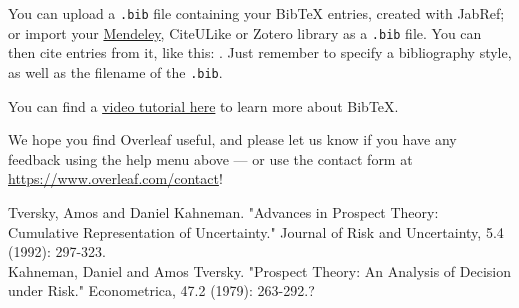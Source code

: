 \documentclass[12pt, letterpaper]{article}
\numberwithin{equation}{section}
\theoremstyle{definition}
\begin{document}
You can upload a \verb|.bib| file containing your BibTeX entries, created with JabRef; or import your \href{https://www.overleaf.com/blog/184}{Mendeley}, CiteULike or Zotero library as a \verb|.bib| file. You can then cite entries from it, like this: \cite{greenwade93}. Just remember to specify a bibliography style, as well as the filename of the \verb|.bib|.

You can find a \href{https://www.overleaf.com/help/97-how-to-include-a-bibliography-using-bibtex}{video tutorial here} to learn more about BibTeX.

We hope you find Overleaf useful, and please let us know if you have any feedback using the help menu above --- or use the contact form at \url{https://www.overleaf.com/contact}!




\noindent
\hangindent=0.7cm
Tversky, Amos and Daniel Kahneman. "Advances in Prospect Theory: Cumulative Representation of Uncertainty." Journal of Risk and Uncertainty, 5.4 (1992): 297-323.\\

\noindent
\hangindent=0.7cm
Kahneman, Daniel and Amos Tversky. "Prospect Theory: An Analysis of Decision under Risk." Econometrica, 47.2 (1979): 263-292.?\\
\end{document}
